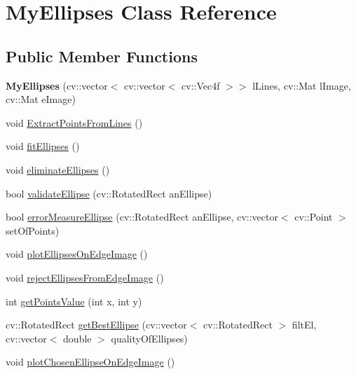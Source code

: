 \hypertarget{classMyEllipses}{
\section{MyEllipses Class Reference}
\label{classMyEllipses}
}
\subsection*{Public Member Functions}
\begin{DoxyCompactItemize}
\item 
\hypertarget{classMyEllipses_a6e030ecf1da66ef051c9bae6698adc9f}{
{\bfseries MyEllipses} (cv::vector$<$ cv::vector$<$ cv::Vec4f $>$$>$ lLines, cv::Mat lImage, cv::Mat eImage)}
\label{classMyEllipses_a6e030ecf1da66ef051c9bae6698adc9f}

\item 
void \hyperlink{classMyEllipses_ae3b80d1c6fa91ea4f79a248692221def}{ExtractPointsFromLines} ()
\item 
void \hyperlink{classMyEllipses_a2a70622b31382d0963636f1395431d8f}{fitEllipses} ()
\item 
void \hyperlink{classMyEllipses_a86c9f35038267eefb37377a564e19708}{eliminateEllipses} ()
\item 
bool \hyperlink{classMyEllipses_ab6caac8fbf9d5437ef23d28010049f54}{validateEllipse} (cv::RotatedRect anEllipse)
\item 
bool \hyperlink{classMyEllipses_a22d5aa9a9f25e43a05230de8b375e4ae}{errorMeasureEllipse} (cv::RotatedRect anEllipse, cv::vector$<$ cv::Point $>$ setOfPoints)
\item 
void \hyperlink{classMyEllipses_a5da32ae0839fbbeb68eb100bc6e1a957}{plotEllipsesOnEdgeImage} ()
\item 
void \hyperlink{classMyEllipses_ab67f344f29c74a3e59b32afcaa0e6547}{rejectEllipsesFromEdgeImage} ()
\item 
int \hyperlink{classMyEllipses_ae28837a96d0486b71aaf7796b34aae3f}{getPointsValue} (int x, int y)
\item 
cv::RotatedRect \hyperlink{classMyEllipses_a2e1afdde16509b2fe105fa9ecbd8e17c}{getBestEllipse} (cv::vector$<$ cv::RotatedRect $>$ filtEl, cv::vector$<$ double $>$ qualityOfEllipses)
\item 
void \hyperlink{classMyEllipses_ad5304c2c7bc8a80ae31c657ebdd0577a}{plotChosenEllipseOnEdgeImage} ()
\end{DoxyCompactItemize}
